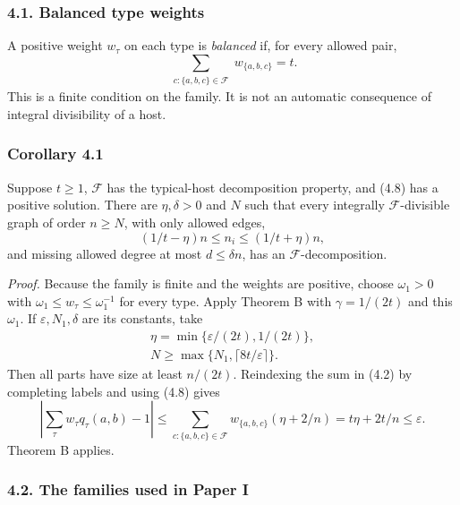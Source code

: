 \documentclass[english,11pt,a4paper]{article}
\begin{document}
\subsubsection{4.1. Balanced type weights}\label{balanced-type-weights}

A positive weight \(w_\tau\) on each type is \emph{balanced} if, for every allowed pair, \[\sum_{\substack{c:\{a,b,c\}\in\mathcal F}}w_{\{a,b,c\}}=t.
\tag{4.8}\] This is a finite condition on the family. It is not an automatic consequence of integral divisibility of a host.

\subsubsection{Corollary 4.1}\label{corollary-4.1}

Suppose \(t\ge1\), \(\mathcal F\) has the typical-host decomposition property, and (4.8) has a positive solution. There are \(\eta,\delta>0\) and \(N\) such that every integrally \(\mathcal F\)-divisible graph of order \(n\ge N\), with only allowed edges, \[(1/t-\eta)n\le n_i\le(1/t+\eta)n,
\tag{4.9}\] and missing allowed degree at most \(d\le\delta n\), has an \(\mathcal F\)-decomposition.

\emph{Proof.} Because the family is finite and the weights are positive, choose \(\omega_1>0\) with \(\omega_1\le w_\tau\le\omega_1^{-1}\) for every type. Apply Theorem B with \(\gamma=1/(2t)\) and this \(\omega_1\). If \(\varepsilon,N_1,\delta\) are its constants, take \[\begin{gathered}
\eta=\min\{\varepsilon/(2t),1/(2t)\},\\
N\ge\max\{N_1,\lceil8t/\varepsilon\rceil\}.
\end{gathered}
\tag{4.10}\] Then all parts have size at least \(n/(2t)\). Reindexing the sum in (4.2) by completing labels and using (4.8) gives \[\left|\sum_\tau w_\tau q_\tau(a,b)-1\right|
\le\sum_{c:\{a,b,c\}\in\mathcal F}
w_{\{a,b,c\}}(\eta+2/n)
=t\eta+2t/n\le\varepsilon.
\tag{4.11}\] Theorem B applies.

\subsubsection{4.2. The families used in Paper I}\label{the-families-used-in-paper-i}
\end{document}
